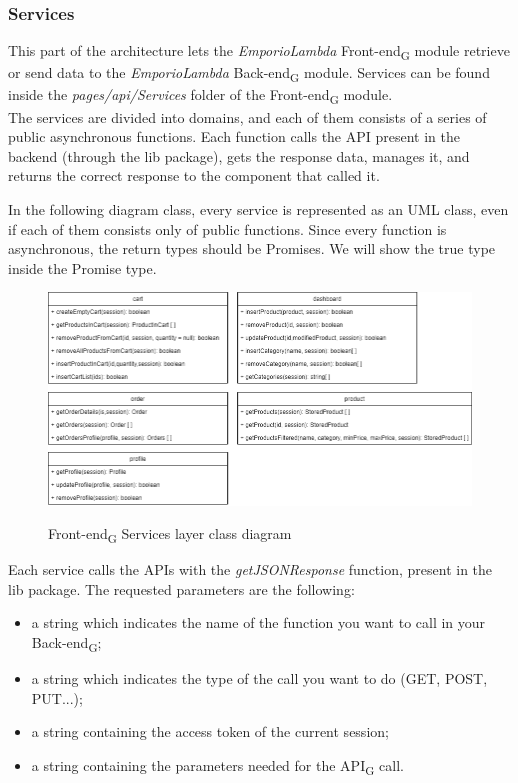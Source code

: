 \subsubsection{Services}
This part of the architecture lets the \textit{EmporioLambda} Front-end\textsubscript{G} module retrieve or send data to the \textit{EmporioLambda} Back-end\textsubscript{G} module. Services can be found inside the \textit{pages/api/Services} folder of the Front-end\textsubscript{G} module.\\

The services are divided into domains, and each of them consists of a series of public asynchronous functions. Each function calls the API present in the backend (through the lib package), gets the response data, manages it, and returns the correct response to the component that called it.

In the following diagram class, every service is represented as an UML class, even if each of them consists only of public functions. Since every function is asynchronous, the return types should be Promises. We will show the true type inside the Promise type.

\begin{figure}[H]
\centering
\includegraphics[scale=0.50]{res/Architettura/Frontend/img/services_frontend_class}\\
\caption{Front-end\textsubscript{G} Services layer class diagram}
\end{figure}


Each service calls the APIs with the \textit{getJSONResponse} function, present in the lib package. The requested parameters are the following:

\begin{itemize}
\item a string which indicates the name of the function you want to call in your Back-end\textsubscript{G}; 
\item a string which indicates the type of the call you want to do (GET, POST, PUT...);
\item a string containing the access token of the current session; 
\item a string containing the parameters needed for the API\textsubscript{G} call. 
\end{itemize} 


